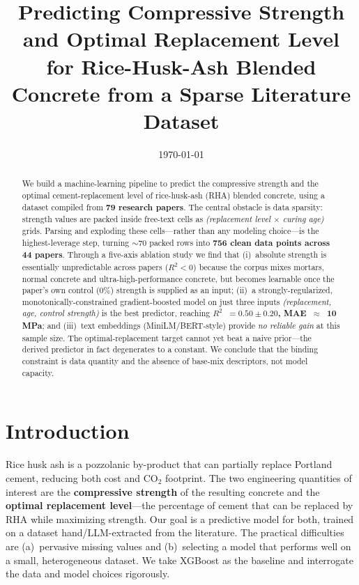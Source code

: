 \documentclass[11pt]{article}
\title{\textbf{Predicting Compressive Strength and Optimal Replacement Level\\
for Rice-Husk-Ash Blended Concrete from a Sparse Literature Dataset}}
\author{}
\date{\today}
\newcommand{\R}{$R^2$}
\begin{document}
\maketitle
\begin{abstract}
\noindent
We build a machine-learning pipeline to predict the compressive strength and the
optimal cement-replacement level of rice-husk-ash (RHA) blended concrete, using a
dataset compiled from \textbf{79 research papers}. The central obstacle is data
sparsity: strength values are packed inside free-text cells as
\emph{(replacement level $\times$ curing age)} grids. Parsing and exploding these
cells---rather than any modeling choice---is the highest-leverage step, turning
$\sim$70 packed rows into \textbf{756 clean data
points across 44 papers}. Through a five-axis ablation study we find that
(i)~absolute strength is essentially unpredictable across papers ($R^2<0$) because
the corpus mixes mortars, normal concrete and ultra-high-performance concrete, but
becomes learnable once the paper's own control (0\%) strength is supplied as an
input; (ii)~a strongly-regularized, monotonically-constrained gradient-boosted
model on just three inputs \emph{(replacement, age, control strength)} is the best
predictor, reaching \textbf{\R{}~$=0.50\pm0.20$, MAE~$\approx$~10\,MPa}; and
(iii)~text embeddings (MiniLM/BERT-style) provide \emph{no reliable gain} at this
sample size. The optimal-replacement target cannot yet beat a naive prior---the
derived predictor in fact degenerates to a constant. We conclude that the binding
constraint is data quantity and the absence of base-mix descriptors, not model
capacity.
\end{abstract}


\section{Introduction}
Rice husk ash is a pozzolanic by-product that can partially replace Portland cement,
reducing both cost and $\mathrm{CO_2}$ footprint. The two engineering quantities of
interest are the \textbf{compressive strength} of the resulting concrete and the
\textbf{optimal replacement level}---the percentage of cement that can be replaced by
RHA while maximizing strength. Our goal is a predictive model for both, trained on a
dataset hand/LLM-extracted from the literature. The practical difficulties are
(a)~pervasive missing values and (b)~selecting a model that performs well on a small,
heterogeneous dataset. We take XGBoost as the baseline and interrogate the data and
model choices rigorously.
\end{document}
